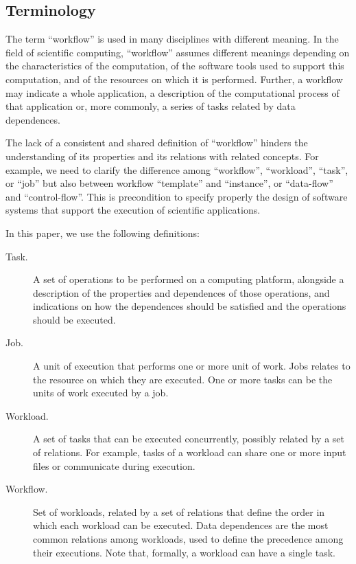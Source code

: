 \subsection{Terminology}


The term ``workflow'' is used in many disciplines with different meaning. In the
field of scientific computing, ``workflow'' assumes different meanings depending
on the characteristics of the computation, of the software tools used to support
this computation, and of the resources on which it is performed. Further, a
workflow may indicate a whole application, a description of the computational
process of that application or, more commonly, a series of tasks related by data
dependences.

The lack of a consistent and shared definition of ``workflow'' hinders the
understanding of its properties and its relations with related concepts. For
example, we need to clarify the difference among ``workflow'', ``workload'',
``task'', or ``job'' but also between workflow ``template'' and ``instance'', or
``data-flow'' and ``control-flow''. This is precondition to specify properly the
design of software systems that support the execution of scientific
applications.

In this paper, we use the following definitions:

\begin{description}

  \item[Task.] A set of operations to be performed on a computing platform,
  alongside a description of the properties and dependences of those operations,
  and indications on how the dependences should be satisfied and the operations
  should be executed.

  \item[Job.] A unit of execution that performs one or more unit of work. Jobs
  relates to the resource on which they are executed. One or more tasks can be
  the units of work executed by a job.

  \item[Workload.] A set of tasks that can be executed concurrently, possibly
  related by a set of relations. For example, tasks of a workload can share one
  or more input files or communicate during execution.

  \item[Workflow.] Set of workloads, related by a set of relations that define
  the order in which each workload can be executed. Data dependences are the
  most common relations among workloads, used to define the precedence among
  their executions. Note that, formally, a workload can have a single task.

\end{description}

